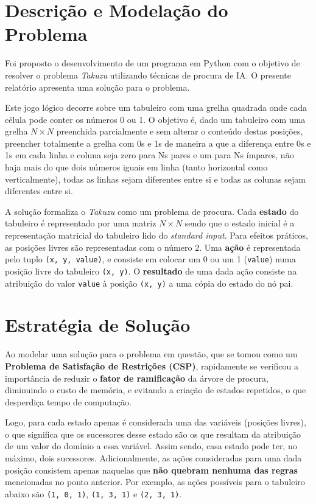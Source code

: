 \documentclass[12pt,a4paper]{article}
\begin{document}
\section{Descrição e Modelação do Problema}

Foi proposto o desenvolvimento de um programa em Python com o objetivo de resolver o
problema \textit{Takuzu} utilizando técnicas de procura de IA.
O presente relatório apresenta uma solução para o problema.

Este jogo lógico decorre sobre um tabuleiro com uma grelha quadrada onde cada célula
pode conter os números 0 ou 1.
O objetivo é, dado um tabuleiro com uma grelha \(N \times N\) preenchida parcialmente e
sem alterar o conteúdo destas posições, preencher totalmente a grelha com 0s e 1s de maneira
a que a diferença entre 0s e 1s em cada linha e coluna seja zero para Ns pares e um para Ns ímpares,
não haja mais do que dois números iguais em linha (tanto horizontal como verticalmente),
todas as linhas sejam diferentes entre si e todas as colunas sejam diferentes entre si.

A solução formaliza o \textit{Takuzu} como um problema de procura.
Cada \textbf{estado} do tabuleiro é representado por uma matriz \(N \times N\) sendo que o estado inicial
é a representação matricial do tabuleiro lido do \textit{standard input}.
Para efeitos práticos, as posições livres são representadas com o número 2.
Uma \textbf{ação} é representada pelo tuplo \texttt{(x, y, value)}, e consiste em colocar um 0 ou um 1 (\texttt{value})
numa posição livre do tabuleiro \texttt{(x, y)}. O \textbf{resultado} de uma dada ação consiste na
atribuição do valor \texttt{value} à posição \texttt{(x, y)} a uma cópia do estado do nó pai.

\section{Estratégia de Solução}

Ao modelar uma solução para o problema em questão, que se tomou como um \textbf{Problema de Satisfação de Restrições (CSP)},
rapidamente se verificou a importância de reduzir
o \textbf{fator de ramificação} da árvore de procura, diminuindo o custo de memória,
e evitando a criação de estados repetidos, o que desperdiça tempo de computação.

Logo, para cada estado apenas é considerada uma das variáveis (posições livres), o que significa
que os sucessores desse estado são os que resultam da atribuição de um valor do domínio a essa variável.
Assim sendo, casa estado pode ter, no máximo, dois sucessores.
Adicionalmente, as ações consideradas para uma dada posição consistem apenas naquelas que
\textbf{não quebram nenhuma das regras} mencionadas no ponto anterior.
Por exemplo, as ações possíveis para o tabuleiro abaixo são
\texttt{(1, 0, 1)}, \texttt{(1, 3, 1)} e \texttt{(2, 3, 1)}.
\end{document}
